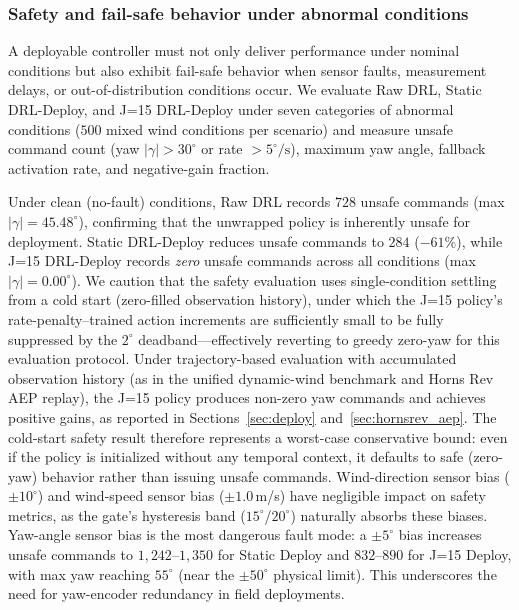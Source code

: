 \documentclass[final,5p,times]{elsarticle}
\begin{document}
\subsubsection{Safety and fail-safe behavior under abnormal conditions}\label{sec:safety}

A deployable controller must not only deliver performance under nominal conditions but also exhibit fail-safe behavior when sensor faults, measurement delays, or out-of-distribution conditions occur. We evaluate Raw DRL, Static DRL-Deploy, and J=15 DRL-Deploy under seven categories of abnormal conditions ($500$ mixed wind conditions per scenario) and measure unsafe command count (yaw $|{\gamma}|{>}30^\circ$ or rate ${>}5^\circ\!/\!\mathrm{s}$), maximum yaw angle, fallback activation rate, and negative-gain fraction.

Under clean (no-fault) conditions, Raw DRL records $728$ unsafe commands (max $|{\gamma}|{=}45.48^\circ$), confirming that the unwrapped policy is inherently unsafe for deployment. Static DRL-Deploy reduces unsafe commands to $284$ ($-61\%$), while J=15 DRL-Deploy records \emph{zero} unsafe commands across all conditions (max $|{\gamma}|{=}0.00^\circ$). We caution that the safety evaluation uses single-condition settling from a cold start (zero-filled observation history), under which the J=15 policy's rate-penalty--trained action increments are sufficiently small to be fully suppressed by the $2^\circ$ deadband---effectively reverting to greedy zero-yaw for this evaluation protocol. Under trajectory-based evaluation with accumulated observation history (as in the unified dynamic-wind benchmark and Horns Rev AEP replay), the J=15 policy produces non-zero yaw commands and achieves positive gains, as reported in Sections~\ref{sec:deploy} and~\ref{sec:hornsrev_aep}. The cold-start safety result therefore represents a worst-case conservative bound: even if the policy is initialized without any temporal context, it defaults to safe (zero-yaw) behavior rather than issuing unsafe commands. Wind-direction sensor bias ($\pm10^\circ$) and wind-speed sensor bias ($\pm1.0$\,m/s) have negligible impact on safety metrics, as the gate's hysteresis band ($15^\circ$/$20^\circ$) naturally absorbs these biases. Yaw-angle sensor bias is the most dangerous fault mode: a $\pm5^\circ$ bias increases unsafe commands to $1{,}242$--$1{,}350$ for Static Deploy and $832$--$890$ for J=15 Deploy, with max yaw reaching $55^\circ$ (near the $\pm50^\circ$ physical limit). This underscores the need for yaw-encoder redundancy in field deployments.
\end{document}
